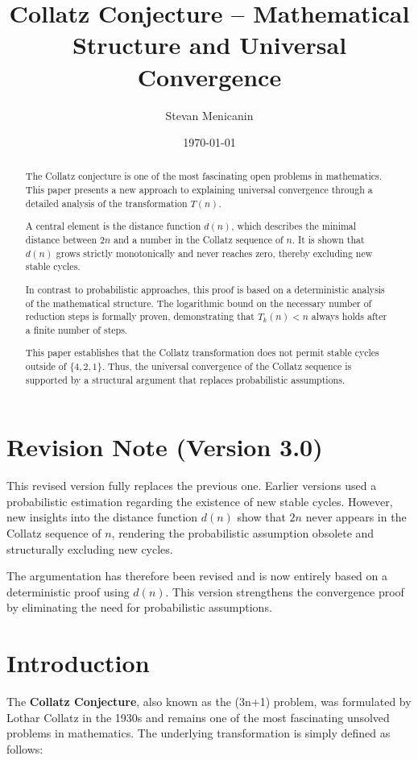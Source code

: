 \documentclass[a4paper,12pt]{article}
\title{Collatz Conjecture – Mathematical Structure and Universal Convergence}
\author{Stevan Menicanin}
\date{\today}
\begin{document}
\maketitle

\section*{Revision Note (Version 3.0)}
This revised version fully replaces the previous one. Earlier versions used a probabilistic estimation regarding the existence of new stable cycles. However, new insights into the distance function $d(n)$ show that $2n$ never appears in the Collatz sequence of $n$, rendering the probabilistic assumption obsolete and structurally excluding new cycles.

The argumentation has therefore been revised and is now entirely based on a deterministic proof using $d(n)$. This version strengthens the convergence proof by eliminating the need for probabilistic assumptions.

\begin{abstract}
    The Collatz conjecture is one of the most fascinating open problems in mathematics. This paper presents a new approach to explaining universal convergence through a detailed analysis of the transformation $T(n)$. 
    
    A central element is the distance function $d(n)$, which describes the minimal distance between $2n$ and a number in the Collatz sequence of $n$. It is shown that $d(n)$ grows strictly monotonically and never reaches zero, thereby excluding new stable cycles.
    
    In contrast to probabilistic approaches, this proof is based on a deterministic analysis of the mathematical structure. The logarithmic bound on the necessary number of reduction steps is formally proven, demonstrating that $T_k(n) < n$ always holds after a finite number of steps.
    
    This paper establishes that the Collatz transformation does not permit stable cycles outside of $\{4, 2, 1\}$. Thus, the universal convergence of the Collatz sequence is supported by a structural argument that replaces probabilistic assumptions.
\end{abstract}



\newpage
\tableofcontents

\clearpage

\section{Introduction}
The \textbf{Collatz Conjecture}, also known as the (3n+1) problem, was formulated by Lothar Collatz in the 1930s and remains one of the most fascinating unsolved problems in mathematics. The underlying transformation is simply defined as follows:
\end{document}
